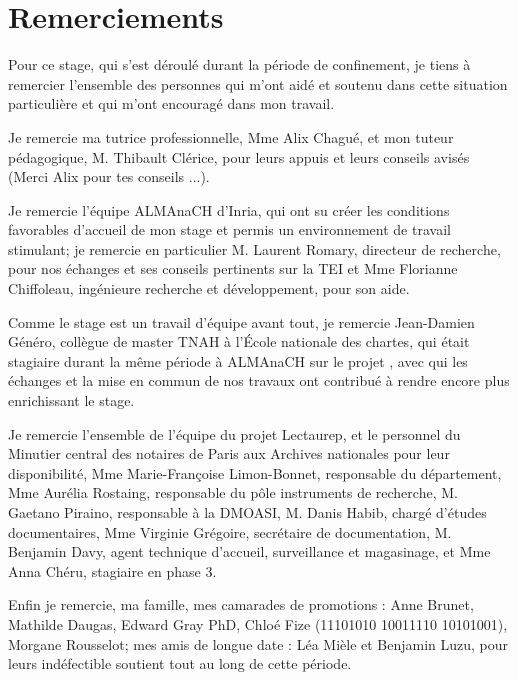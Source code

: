 \chapter*{Remerciements}

Pour ce stage, qui s'est déroulé durant la période de confinement, je tiens à remercier l'ensemble des personnes qui m'ont aidé et soutenu dans cette situation particulière et qui m'ont encouragé dans mon travail.

Je remercie ma tutrice professionnelle, Mme Alix Chagué, et mon tuteur pédagogique, M. Thibault Clérice, pour leurs appuis et leurs conseils avisés (Merci Alix pour tes conseils ...).

Je remercie l'équipe ALMAnaCH d'Inria, qui ont su créer les conditions favorables d'accueil de mon stage et permis un environnement de travail stimulant; je remercie en particulier M. Laurent Romary, directeur de recherche, pour nos échanges et ses conseils pertinents sur la TEI et Mme Florianne Chiffoleau, ingénieure recherche et développement, pour son aide.

Comme le stage est un travail d'équipe avant tout, je remercie Jean-Damien Généro, collègue de master TNAH à l'École nationale des chartes, qui était stagiaire durant la même période à ALMAnaCH sur le projet , avec qui les échanges et la mise en commun de nos travaux ont contribué à rendre encore plus enrichissant le stage.

Je remercie l'ensemble de l'équipe du projet Lectaurep, et le personnel du Minutier central des notaires de Paris aux Archives nationales pour leur disponibilité, Mme Marie-Françoise Limon-Bonnet, responsable du département, Mme Aurélia Rostaing, responsable du pôle instruments de recherche, M. Gaetano Piraino, responsable à la DMOASI, M. Danis Habib, chargé d'études documentaires, Mme Virginie Grégoire, secrétaire de documentation, M. Benjamin Davy, agent technique d'accueil, surveillance et magasinage, et Mme Anna Chéru, stagiaire en phase 3. 

Enfin je remercie, ma famille, mes camarades de promotions : Anne Brunet, Mathilde Daugas, Edward Gray PhD, Chloé Fize (11101010 10011110 10101001), Morgane Rousselot; mes amis de longue date : Léa Mièle et Benjamin Luzu, pour leurs indéfectible soutient tout au long de cette période. 